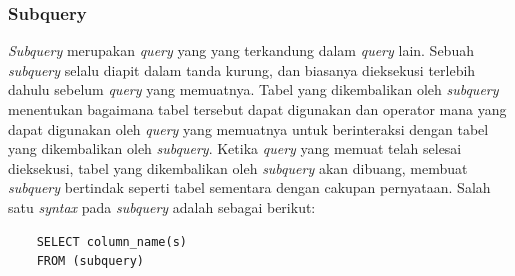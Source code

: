 \subsubsection{Subquery}
\textit{Subquery} merupakan \textit{query} yang yang terkandung dalam \textit{query} lain. Sebuah \textit{subquery} selalu diapit dalam tanda kurung, dan biasanya dieksekusi terlebih dahulu sebelum \textit{query} yang memuatnya. Tabel yang dikembalikan oleh \textit{subquery} menentukan bagaimana tabel tersebut dapat digunakan dan operator mana yang dapat digunakan oleh \textit{query} yang memuatnya untuk berinteraksi dengan tabel yang dikembalikan oleh \textit{subquery}. Ketika \textit{query} yang memuat telah selesai dieksekusi, tabel yang dikembalikan oleh \textit{subquery} akan dibuang, membuat \textit{subquery} bertindak seperti tabel sementara dengan cakupan pernyataan. Salah satu \textit{syntax} pada \textit{subquery} adalah sebagai berikut:
\begin{verbatim}
    SELECT column_name(s)
    FROM (subquery)
\end{verbatim}


